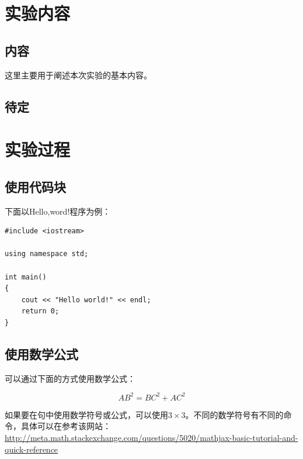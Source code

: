 \documentclass[hyperref,UTF8]{ctexart}
\begin{document}

\section{实验内容}

\subsection{内容}

这里主要用于阐述本次实验的基本内容。

\subsection{待定}


\section{实验过程}

\subsection{使用代码块}

下面以Hello,word!程序为例：

\begin{lstlisting}
#include <iostream>

using namespace std;

int main()
{
    cout << "Hello world!" << endl;
    return 0;
}
\end{lstlisting}

\subsection{使用数学公式}

可以通过下面的方式使用数学公式：

\begin{equation}
AB^2 = BC^2 + AC^2
\end{equation}

如果要在句中使用数学符号或公式，可以使用$3 \times 3$。不同的数学符号有不同的命令，具体可以在参考该网站：\url{http://meta.math.stackexchange.com/questions/5020/mathjax-basic-tutorial-and-quick-reference}
\end{document}
